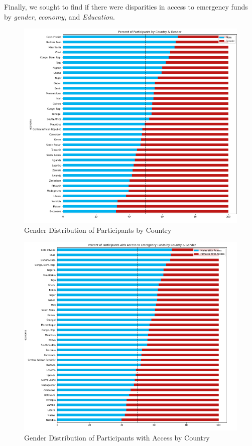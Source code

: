 \documentclass[water,article,submit,moreauthors,pdftex]{mdpi}
\begin{document}
Finally, we sought to find if there were disparities in access to
emergency funds by \emph{gender}, \emph{economy}, and \emph{Education}.

\begin{figure}
\centering
\includegraphics[width=\textwidth,height=0.5\textheight]{images/percent_participants_by_country_gender.png}
\caption{Gender Distribution of Participants by Country}
\end{figure}

\begin{figure}
\centering
\includegraphics[width=\textwidth,height=0.5\textheight]{images/percent_access_funds_by_country_gender.png}
\caption{Gender Distribution of Participants with Access by Country}
\end{figure}
\end{document}
